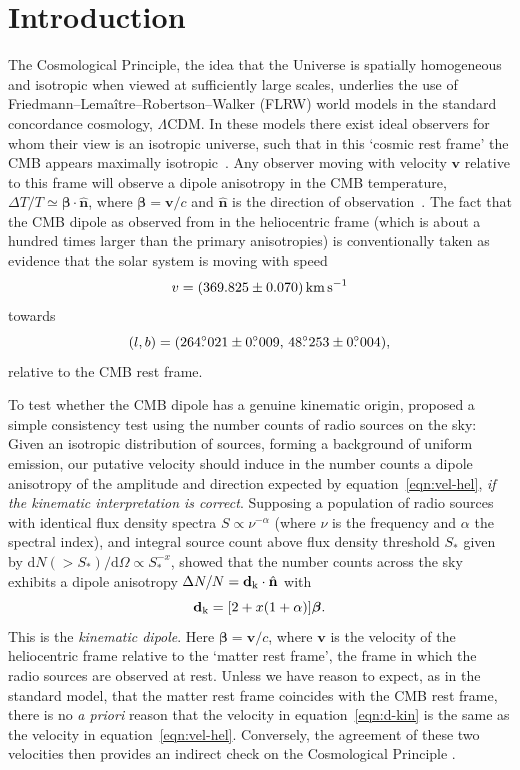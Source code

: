 \documentclass[fleqn,usenatbib]{mnras}
\def\be{\begin{equation}}\def\ee{\end{equation}}
\def\LCDM{$\Lambda$CDM}
\def\dif{\mathrm{d}}
\def\v{\mathbf{v}}
\def\n{\hat{\mathbf{n}}}
\def\kin{{\rm k}}
\def\dkin{\mathbf{d}_{\kin}}
\newcommand{\dotdeg}{\rlap{.}^\circ}
\begin{document}
\section{Introduction}
%
The Cosmological Principle, the idea that the Universe is spatially homogeneous
and isotropic when viewed at sufficiently large scales, underlies the use of
Friedmann--Lema\^{i}tre--Robertson--Walker (FLRW) world models in the standard concordance cosmology, \LCDM.
In these models there exist ideal observers for whom their view is an isotropic universe, such that
in this `cosmic rest frame' the CMB appears maximally isotropic~\citep{2011RSPTA.369.5115M}.
%
Any observer moving with velocity $\v$ relative to this frame
will observe a dipole anisotropy in the CMB temperature, $\Delta T/T\simeq\bm\beta\cdot\n$, where $\bm\beta=\v/c$
and $\n$ is the direction of observation~\citep{1967Natur.216..748S,1968PhRv..174.2168P}.
%
The fact that the  CMB dipole as observed from in the heliocentric frame (which is about a
hundred times larger than the primary anisotropies) 
is conventionally taken as evidence that the solar system 
is moving with speed~\citep{2020A&A...641A...3P}
\be\label{eqn:vel-hel}
    v=(369.825\pm0.070)\,{\rm km\,s}^{-1}
\ee
towards
\be
    (l,b)=(264\dotdeg021\pm0\dotdeg009,\,48\dotdeg253\pm0\dotdeg004),
\ee
relative to the CMB rest frame.

To test whether the CMB dipole has a genuine kinematic origin, \citet{1984MNRAS.206..377E}
proposed a simple consistency test using the
number counts of radio sources on the sky:
Given an isotropic distribution of sources, forming a  background of uniform emission,
our putative velocity should induce in the number counts a dipole anisotropy
of the amplitude and direction expected by equation~\eqref{eqn:vel-hel},
{\it if the kinematic interpretation is correct}.
%
Supposing a population of radio sources with identical flux density spectra
$S\propto \nu^{-\alpha}$ (where $\nu$ is the frequency and $\alpha$ the spectral index),
and integral source count above flux density threshold $S_*$ given by
$\dif N(>S_*)/\dif\Omega\propto S_*^{-x}$, \citet{1984MNRAS.206..377E} showed that
the number counts across the sky exhibits a dipole anisotropy $\Delta N/N=\dkin\cdot\n$ with
\be
    \dkin=[2+x(1+\alpha)]\bm\beta.
    \label{eqn:d-kin}
\ee
This is the \emph{kinematic dipole}.
Here ${\bm\beta} = \v/c $, where $\v$ is the velocity of the heliocentric frame relative to the
`matter rest frame', the frame in which the radio sources are observed at rest.
Unless we have reason to expect, as in the standard model, that the matter rest frame
coincides with the CMB rest frame, there is no {\it a priori} reason that the velocity
in equation~\eqref{eqn:d-kin} is the same as the velocity in equation~\eqref{eqn:vel-hel}.
Conversely, the agreement of these two velocities
then provides an indirect check on the Cosmological Principle
\citep[for a recent appraisal on its observational status, see][]{Aluri:2022hzs}.
\end{document}

